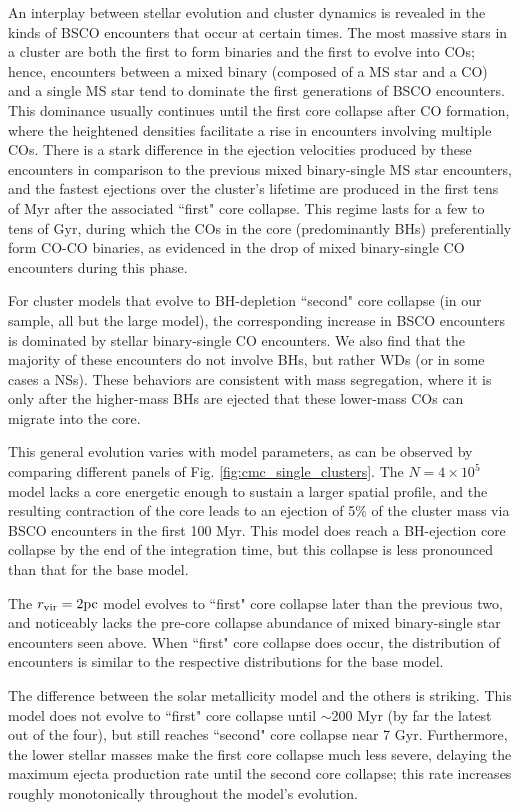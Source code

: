 \documentclass[twocolumn]{aastex631}
\begin{document}
An interplay between stellar evolution and cluster dynamics is revealed in the kinds of BSCO encounters that occur at certain times.
The most massive stars in a cluster are both the first to form binaries and the first to evolve into COs; hence, encounters between a mixed binary (composed of a MS star and a CO) and a single MS star tend to dominate the first generations of BSCO encounters.
This dominance usually continues until the first core collapse after CO formation, where the heightened densities facilitate a rise in encounters involving multiple COs.
There is a stark difference in the ejection velocities produced by these encounters in comparison to the previous mixed binary-single MS star encounters, and the fastest ejections over the cluster's lifetime are produced in the first tens of Myr after the associated ``first" core collapse.
This regime lasts for a few to tens of Gyr, during which the COs in the core (predominantly BHs) preferentially form CO-CO binaries, as evidenced in the drop of mixed binary-single CO encounters during this phase.

For cluster models that evolve to BH-depletion ``second" core collapse (in our sample, all but the large model), the corresponding increase in BSCO encounters is dominated by stellar binary-single CO encounters.
We also find that the majority of these encounters do not involve BHs, but rather WDs (or in some cases a NSs).
These behaviors are consistent with mass segregation, where it is only after the higher-mass BHs are ejected that these lower-mass COs can migrate into the core.

This general evolution varies with model parameters, as can be observed by comparing different panels of Fig. \ref{fig:cmc_single_clusters}.
The $N = 4 \times 10^5$ model lacks a core energetic enough to sustain a larger spatial profile, and the resulting contraction of the core leads to an ejection of 5\% of the cluster mass via BSCO encounters in the first 100 Myr.
This model does reach a BH-ejection core collapse by the end of the integration time, but this collapse is less pronounced than that for the base model.

The $r_{\rm vir} = 2 {\rm pc}$ model evolves to ``first" core collapse later than the previous two, and noticeably lacks the pre-core collapse abundance of mixed binary-single star encounters seen above.
When ``first" core collapse does occur, the distribution of encounters is similar to the respective distributions for the base model.

The difference between the solar metallicity model and the others is striking.
This model does not evolve to ``first" core collapse until $\sim$200 Myr (by far the latest out of the four), but still reaches ``second" core collapse near 7 Gyr.
Furthermore, the lower stellar masses make the first core collapse much less severe, delaying the maximum ejecta production rate until the second core collapse; this rate increases roughly monotonically throughout the model's evolution.
\end{document}
